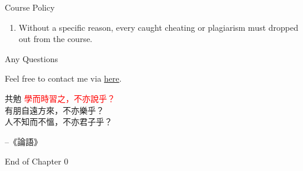 \documentclass{beamer}
\begin{document}
\begin{frame}{Course Policy}
\begin{enumerate}
\pause
\item Without a specific reason, every caught cheating or plagiarism must dropped out from the course. \\
\end{enumerate}
\end{frame}
\begin{frame}{Any Questions}
\begin{center}
Feel free to contact me via \href{mailto:politics.tchsiao@gmail.com}{here}.
\end{center}
\end{frame}
\begin{frame}{共勉}
\normalsize{\textcolor{red}{學而時習之，不亦說乎？}} \\
\vspace{1em}
\normalsize{有朋自遠方來，不亦樂乎？} \\
\vspace{1em}
\normalsize{人不知而不慍，不亦君子乎？} \\
\vspace{1em}
\begin{flushright}
--《論語》
\end{flushright}
\end{frame}
\begin{frame}{}
\begin{center}
\Large{End of Chapter 0}
\end{center}
\end{frame}
\end{document}
